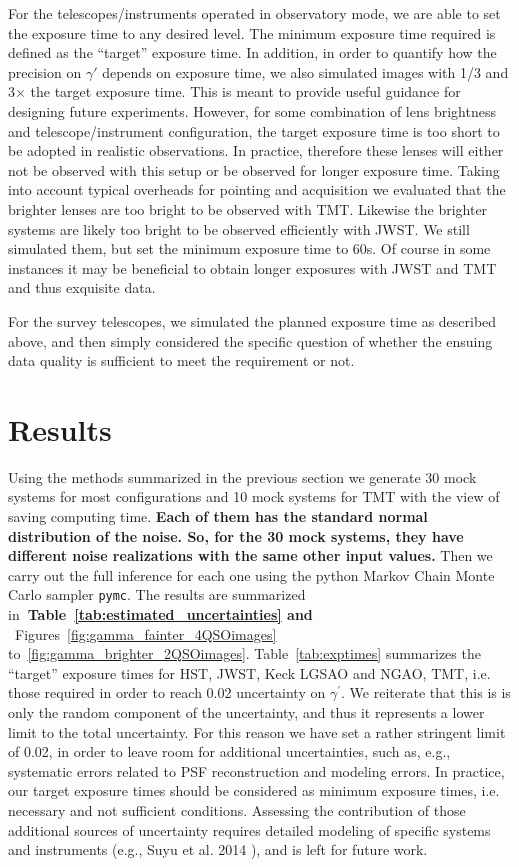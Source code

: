 \documentclass[a4paper,11pt]{article}
\begin{document}
For the telescopes/instruments operated in observatory mode, we are
able to set the exposure time to any desired level. The minimum
exposure time required is defined as the ``target'' exposure time. In
addition, in order to quantify how the precision on $\gamma'$ depends
on exposure time, we also simulated images with 1/3 and 3$\times$ the
target exposure time. This is meant to provide useful guidance for
designing future experiments. However, for some combination of lens
brightness and telescope/instrument configuration, the target exposure
time is too short to be adopted in realistic observations. In
practice, therefore these lenses will either not be observed with this
setup or be observed for longer exposure time. Taking into account
typical overheads for pointing and acquisition we evaluated that the
brighter lenses are too bright to be observed with TMT.  Likewise the
brighter systems are likely too bright to be observed efficiently with
JWST. We still simulated them, but set the minimum exposure time to
60s. Of course in some instances it may be beneficial to obtain longer
exposures with JWST and TMT and thus exquisite data.

For the survey telescopes, we simulated the planned exposure time as
described above, and then  simply considered the specific question of
whether the ensuing data quality is sufficient to meet the requirement
or not.

\section{Results}

Using the methods summarized in the previous section we generate 30
mock systems for most configurations and 10 mock systems for TMT with
the view of saving computing time. {\bf Each of them has 
the standard normal distribution of the noise. So, for the 30 mock systems, 
they have different noise realizations with the same other input values.} 
Then we carry out the full inference
for each one using the python Markov Chain Monte Carlo sampler
\texttt{pymc}.  The results are summarized
in{\bf ~Table~\ref{tab:estimated_uncertainties} and} ~Figures~\ref{fig:gamma_fainter_4QSOimages}
to~\ref{fig:gamma_brighter_2QSOimages}. Table~\ref{tab:exptimes}
summarizes the ``target'' exposure times for HST, JWST, Keck LGSAO and
NGAO, TMT, i.e. those required in order to reach 0.02 uncertainty on
$\gamma^{\prime}$.  We reiterate that this is is only the random
component of the uncertainty, and thus it represents a lower limit to
the total uncertainty. For this reason we have set a rather stringent
limit of 0.02, in order to leave room for additional uncertainties,
such as, e.g., systematic errors related to PSF reconstruction and
modeling errors.  In practice, our target exposure times should be
considered as minimum exposure times, i.e. necessary and not
sufficient conditions. Assessing the contribution of those additional
sources of uncertainty requires detailed modeling of specific systems
and instruments (e.g., Suyu et al. 2014 \cite{2014ApJ...788L..35S}),
and is left for future work.
\end{document}
